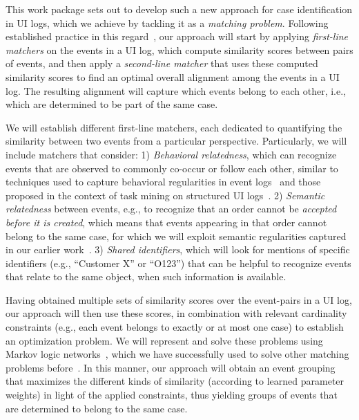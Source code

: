 This work package sets out to develop such a new approach for case identification in UI logs, which we achieve by tackling it as a \textit{matching problem}.
Following established practice in this regard~\cite{gal2011uncertain}, our approach will start by applying \textit{first-line matchers} on the events in a UI log, which compute similarity scores between pairs of events, and then apply a \textit{second-line matcher} that uses these computed similarity scores to find an optimal overall alignment among the events in a UI log. The resulting alignment will capture  which events belong to each other, i.e., which are determined to be part of the same case.

We will establish different first-line matchers, each dedicated to quantifying the similarity between two events from a particular perspective. Particularly, we will include matchers that consider:  1) \textit{Behavioral relatedness}, 
which can recognize events that are observed to commonly co-occur or follow each other, similar to techniques used to capture behavioral regularities in event logs~\cite{diba2020extraction,ferreira2009discovering} and those proposed in the context of task mining on structured UI logs~\cite{leno2020identifying,Urabe21}.
2) \textit{Semantic relatedness} between events, e.g., to  recognize that an order cannot be \textit{accepted before it is created}, which means that events appearing in that order cannot belong to the same case, for which we will exploit semantic regularities captured in our earlier work~\cite{van2021natural}. 3) \textit{Shared identifiers}, which will look for mentions of specific identifiers (e.g., ``Customer X'' or ``O123'') that can be helpful to recognize events that relate to the same object, when such information is available. 


 Having obtained multiple sets of similarity scores over the event-pairs in a UI log, our approach will then use these scores, in combination with relevant cardinality constraints (e.g., each event belongs to exactly or at most one case) to establish an optimization problem. We will represent and solve these problems using Markov logic networks~\cite{lowd2007efficient,richardson2006markov}, which we have successfully used to solve other matching problems before~\cite{leopold2015towards}.
In this manner, our approach will obtain an event grouping that maximizes the different kinds of similarity (according to learned parameter weights) in light of the applied constraints, thus yielding groups of events that are determined to belong to the same case.

